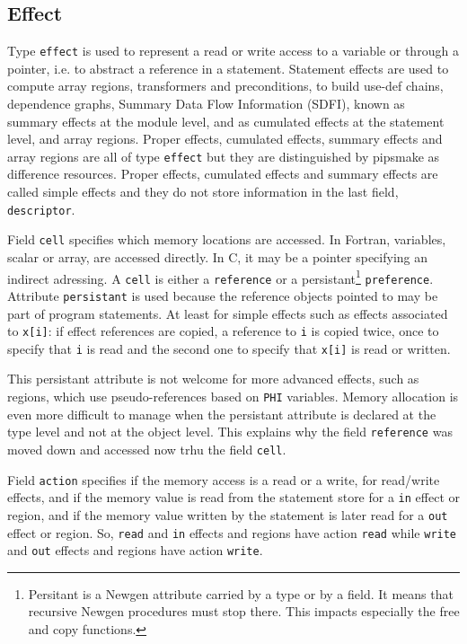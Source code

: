\documentclass[a4paper]{article}
\begin{document}
\subsection{Effect}
\label{subsection-effect}

{}
{}

Type \verb/effect/ is used to represent a read or write access to a
variable or through a pointer, i.e. to abstract a reference in a
statement. Statement effects are used to compute array regions,
transformers and preconditions, to build use-def chains, dependence
graphs, Summary Data Flow Information (SDFI), known as summary effects
at the module level, and as cumulated effects at the statement level,
and array regions. Proper effects, cumulated effects, summary effects
and array regions are all of type \verb/effect/ but they are
distinguished by pipsmake as difference resources. Proper effects,
cumulated effects and summary effects are called simple effects and
they do not store information in the last field, \verb/descriptor/.

Field \verb/cell/ specifies which memory locations are accessed. In
Fortran, variables, scalar or array, are accessed directly. In C, it
may be a pointer specifying an indirect adressing. A \verb/cell/ is
either a \verb/reference/ or a persistant\footnote{Persitant is a
  Newgen attribute carried by a type or by a field. It means that
  recursive Newgen procedures must stop there. This impacts especially
  the free and copy functions.} \verb/preference/. Attribute
\verb/persistant/ is used because the reference objects pointed to may be
part of program statements. At least for simple effects such as
effects associated to \verb/x[i]/: if effect references are copied, a
reference to \verb/i/ is copied twice, once to specify that \verb/i/
is read and the second one to specify that \verb/x[i]/ is read or
written.

This persistant attribute is not welcome for more advanced effects,
such as regions, which use pseudo-references based on \verb/PHI/
variables. Memory allocation is even more difficult to manage when the
persistant attribute is declared at the type level and not at the
object level. This explains why the field \verb/reference/ was moved
down and accessed now trhu the field \verb/cell/.

Field \verb/action/ specifies if the memory access is a read or a write,
for read/write effects, and if the memory value is read from the statement
store for a \verb/in/ effect or region, and if the memory value written by
the statement is later read for a \verb/out/ effect or region. So,
\verb/read/ and \verb/in/ effects and regions have action \verb/read/ while
\verb/write/ and \verb/out/ effects and regions have action \verb/write/.
\end{document}
